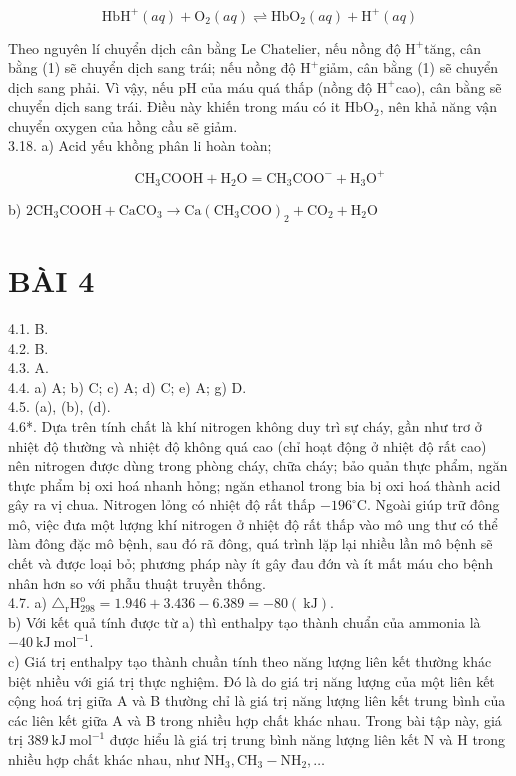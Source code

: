 \documentclass[10pt]{article}
\begin{document}
\begin{equation*}
\mathrm{HbH}^{+}(a q)+\mathrm{O}_{2}(a q) \rightleftharpoons \mathrm{HbO}_{2}(a q)+\mathrm{H}^{+}(a q) \tag{1}
\end{equation*}


Theo nguyên lí chuyển dịch cân bằng Le Chatelier, nếu nồng độ $\mathrm{H}^{+}$tăng, cân bằng (1) sẽ chuyển dịch sang trái; nếu nồng độ $\mathrm{H}^{+}$giảm, cân bằng (1) sẽ chuyển dịch sang phải. Vì vậy, nếu pH của máu quá thấp (nồng độ $\mathrm{H}^{+}$cao), cân bằng sẽ chuyển dịch sang trái. Điều này khiến trong máu có it $\mathrm{HbO}_{2}$, nên khả năng vận chuyển oxygen của hồng cầu sẽ giảm.\\
3.18. a) Acid yếu khồng phân li hoàn toàn;

$$
\mathrm{CH}_{3} \mathrm{COOH}+\mathrm{H}_{2} \mathrm{O}=\mathrm{CH}_{3} \mathrm{COO}^{-}+\mathrm{H}_{3} \mathrm{O}^{+}
$$

b) $2 \mathrm{CH}_{3} \mathrm{COOH}+\mathrm{CaCO}_{3} \rightarrow \mathrm{Ca}\left(\mathrm{CH}_{3} \mathrm{COO}\right)_{2}+\mathrm{CO}_{2}+\mathrm{H}_{2} \mathrm{O}$

\section*{BÀI 4}
4.1. B.\\
4.2. B.\\
4.3. A.\\
4.4. a) A; b) C; c) A; d) C; e) A; g) D.\\
4.5. (a), (b), (d).\\
4.6*. Dựa trên tính chất là khí nitrogen không duy trì sự cháy, gần như trơ ở nhiệt độ thường và nhiệt độ không quá cao (chỉ hoạt động ở nhiệt độ rất cao) nên nitrogen được dùng trong phòng cháy, chữa cháy; bảo quản thực phẩm, ngăn thực phẩm bị oxi hoá nhanh hỏng; ngăn ethanol trong bia bị oxi hoá thành acid gây ra vị chua. Nitrogen lỏng có nhiệt độ rất thấp $-196^{\circ} \mathrm{C}$. Ngoài giúp trữ đông mô, việc đưa một lượng khí nitrogen ở nhiệt độ rất thấp vào mô ung thư có thể làm đông đặc mô bệnh, sau đó rã đông, quá trình lặp lại nhiều lần mô bệnh sẽ chết và được loại bỏ; phương pháp này ít gây đau đớn và ít mất máu cho bệnh nhân hơn so với phẫu thuật truyền thống.\\
4.7. a) $\triangle_{\mathrm{r}} \mathrm{H}_{298}^{\mathrm{o}}=1.946+3.436-6.389=-80(\mathrm{~kJ})$.\\
b) Với kết quả tính được từ a) thì enthalpy tạo thành chuẩn của ammonia là $-40 \mathrm{~kJ} \mathrm{~mol}^{-1}$.\\
c) Giá trị enthalpy tạo thành chuần tính theo năng lượng liên kết thường khác biệt nhiều với giá trị thực nghiệm. Đó là do giá trị năng lượng của một liên kết cộng hoá trị giữa A và B thường chỉ là giá trị năng lượng liên kết trung bình của các liên kết giữa A và B trong nhiều hợp chất khác nhau. Trong bài tập này, giá trị $389 \mathrm{~kJ} \mathrm{~mol}^{-1}$ được hiểu là giá trị trung bình năng lượng liên kết N và H trong nhiều hợp chất khác nhau, như $\mathrm{NH}_{3}, \mathrm{CH}_{3}-\mathrm{NH}_{2}, \ldots$
\end{document}
